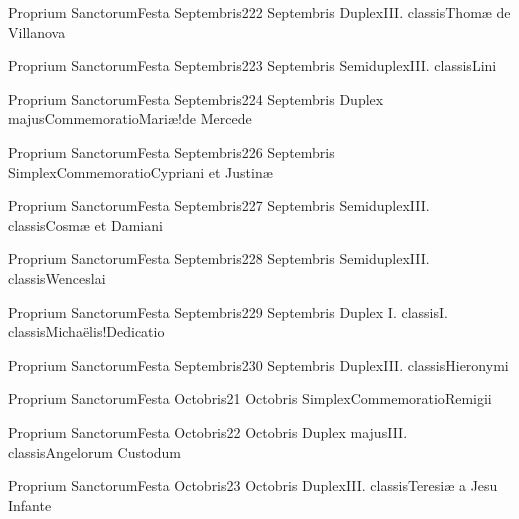 \documentclass[invitatoriale-romanum.tex]{subfiles}
\begin{document}
	{Proprium Sanctorum}{Festa Septembris}{2}{22 Septembris}
	{Duplex}{III. classis}{Thomæ de Villanova}
	{}
	{}

	{Proprium Sanctorum}{Festa Septembris}{2}{23 Septembris}
	{Semiduplex}{III. classis}{Lini}
	{}
	{}

	{Proprium Sanctorum}{Festa Septembris}{2}{24 Septembris}
	{Duplex majus}{Commemoratio}{Mariæ!de Mercede}
	{}
	{\invitferia}

	{Proprium Sanctorum}{Festa Septembris}{2}{26 Septembris}
	{Simplex}{Commemoratio}{Cypriani et Justinæ}
	{}
	{}

	{Proprium Sanctorum}{Festa Septembris}{2}{27 Septembris}
	{Semiduplex}{III. classis}{Cosmæ et Damiani}
	{}
	{}

	{Proprium Sanctorum}{Festa Septembris}{2}{28 Septembris}
	{Semiduplex}{III. classis}{Wenceslai}
	{}
	{}

\pagebreak

	{Proprium Sanctorum}{Festa Septembris}{2}{29 Septembris}
	{Duplex I. classis}{I. classis}{Michaëlis!Dedicatio}
	{}
	{}

	{Proprium Sanctorum}{Festa Septembris}{2}{30 Septembris}
	{Duplex}{III. classis}{Hieronymi}
	{}
	{}


	{Proprium Sanctorum}{Festa Octobris}{2}{1 Octobris}
	{Simplex}{Commemoratio}{Remigii}
	{}
	{\invitferia}

	{Proprium Sanctorum}{Festa Octobris}{2}{2 Octobris}
	{Duplex majus}{III. classis}{Angelorum Custodum}
	{}
	{}

	{Proprium Sanctorum}{Festa Octobris}{2}{3 Octobris}
	{Duplex}{III. classis}{Teresiæ a Jesu Infante}
	{}
	{}
\end{document}
